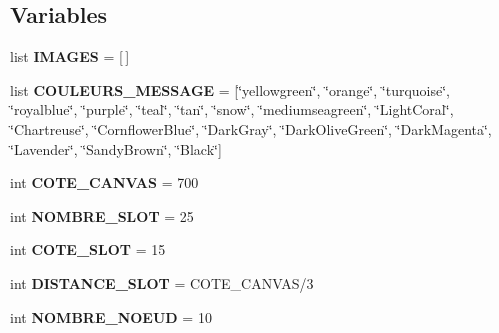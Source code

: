 \subsection*{Variables}
\begin{DoxyCompactItemize}
\item 
list {\bfseries I\+M\+A\+G\+ES} = \mbox{[}$\,$\mbox{]}\hypertarget{namespacesimulation__v2_afd6ac2d963fc7f585ca3f6c4dd2904e4}{}\label{namespacesimulation__v2_afd6ac2d963fc7f585ca3f6c4dd2904e4}

\item 
list {\bfseries C\+O\+U\+L\+E\+U\+R\+S\+\_\+\+M\+E\+S\+S\+A\+GE} = \mbox{[}\char`\"{}yellowgreen\char`\"{}, \char`\"{}orange\char`\"{}, \char`\"{}turquoise\char`\"{}, \char`\"{}royalblue\char`\"{}, \char`\"{}purple\char`\"{}, \char`\"{}teal\char`\"{}, \char`\"{}tan\char`\"{}, \char`\"{}snow\char`\"{}, \char`\"{}mediumseagreen\char`\"{}, \char`\"{}Light\+Coral\char`\"{}, \char`\"{}Chartreuse\char`\"{}, \char`\"{}Cornflower\+Blue\char`\"{}, \char`\"{}Dark\+Gray\char`\"{}, \char`\"{}Dark\+Olive\+Green\char`\"{}, \char`\"{}Dark\+Magenta\char`\"{}, \char`\"{}Lavender\char`\"{}, \char`\"{}Sandy\+Brown\char`\"{}, \char`\"{}Black\char`\"{}\mbox{]}\hypertarget{namespacesimulation__v2_afba3b6f5b61d3e180c849dbb75a5763a}{}\label{namespacesimulation__v2_afba3b6f5b61d3e180c849dbb75a5763a}

\item 
int {\bfseries C\+O\+T\+E\+\_\+\+C\+A\+N\+V\+AS} = 700\hypertarget{namespacesimulation__v2_af16d4a5cc9fab24640e1ef4d692f85cf}{}\label{namespacesimulation__v2_af16d4a5cc9fab24640e1ef4d692f85cf}

\item 
int {\bfseries N\+O\+M\+B\+R\+E\+\_\+\+S\+L\+OT} = 25\hypertarget{namespacesimulation__v2_aab38fd1f830e2688b4ebbb7c97f24e02}{}\label{namespacesimulation__v2_aab38fd1f830e2688b4ebbb7c97f24e02}

\item 
int {\bfseries C\+O\+T\+E\+\_\+\+S\+L\+OT} = 15\hypertarget{namespacesimulation__v2_adb4455a8f64dc1c3ce30925001b6462e}{}\label{namespacesimulation__v2_adb4455a8f64dc1c3ce30925001b6462e}

\item 
int {\bfseries D\+I\+S\+T\+A\+N\+C\+E\+\_\+\+S\+L\+OT} = C\+O\+T\+E\+\_\+\+C\+A\+N\+V\+AS/3\hypertarget{namespacesimulation__v2_a30217fb308fb77f024dea126d63806be}{}\label{namespacesimulation__v2_a30217fb308fb77f024dea126d63806be}

\item 
int {\bfseries N\+O\+M\+B\+R\+E\+\_\+\+N\+O\+E\+UD} = 10\hypertarget{namespacesimulation__v2_ae1baf1a1fb0acad52752ef5cd5193223}{}\label{namespacesimulation__v2_ae1baf1a1fb0acad52752ef5cd5193223}


\end{DoxyCompactItemize}
